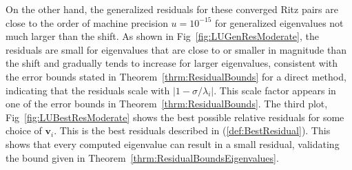 On the other hand, the generalized residuals for these converged Ritz pairs are close to the order of machine precision $u=10^{-15}$ for generalized eigenvalues not much larger than the shift. As shown in Fig~\ref{fig:LUGenResModerate}, the residuals are small for eigenvalues that are close to or smaller in magnitude than the shift and gradually tends to increase for larger eigenvalues, consistent with the error bounds stated in Theorem~\ref{thrm:ResidualBounds} for a direct method, indicating that the residuals scale with $\lvert 1-\sigma/\lambda_i \rvert$. This scale factor appears in one of the error bounds in Theorem~\ref{thrm:ResidualBounds}. The third plot, Fig~\ref{fig:LUBestResModerate} shows the best possible relative residuals for some choice of $\mathbf{v}_i$. This is the best residuals described in (\ref{def:BestResidual}). This shows that every computed eigenvalue can result in a small residual, validating the bound given in Theorem~\ref{thrm:ResidualBoundsEigenvalues}.

